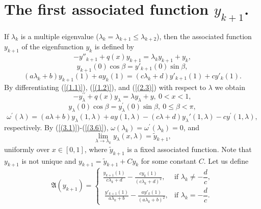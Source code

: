 \documentclass[10pt,a4paper]{amsart}
\numberwithin{equation}{section}
\begin{document}
\section{The first associated function \(y_{k + 1}\).}
If \(\lambda_{k}\) is a multiple  eigenvalue
(\(\lambda_{k} = \lambda_{k + 1}\le\lambda_{k + 2}\)), then the associated function
\(y_{k + 1}\) of the eigenfunction \(y_{k}\) is defined by
\begin{equation}
    {- y''_{k + 1}} + q(x)y_{k + 1} = \lambda_{k}y_{k + 1} + y_{k}, \label{(3.1)}
\end{equation}
\begin{equation}
y_{k + 1}(0)\cos\beta = y'_{k + 1}(0)\sin\beta, \label{(3.2)}
\end{equation}
\begin{equation}
\left( a\lambda_{k} + b \right)y_{k + 1}(1) + ay_{k}(1) = \left( c\lambda_{k} + d \right)y'_{k + 1}(1) + cy'_{k}(1). \label{(3.3)}
\end{equation}
By differentiating (\ref{(1.1)}), (\ref{(1.2)}), and (\ref{(2.3)}) with respect to $\lambda$ we obtain 
\begin{equation}
  -y_\lambda^{\prime \prime }+q(x)y_\lambda=\lambda y_\lambda+y,\ 0<x<1,  \label{(3.4)} 
\end{equation}
\begin{equation}
y_\lambda(0)\cos \beta =y_\lambda^{\prime }(0)\sin \beta ,\ 0\leq \beta <\pi ,
\label{(3.5)}
\end{equation}
\begin{equation}
 \omega^\prime(\lambda) = (a\lambda + b)y_\lambda(1,\lambda)+ay(1,\lambda) - (c\lambda + d)y_\lambda{'}(1,\lambda)-cy^\prime(1,\lambda), \label{(3.6)}   
\end{equation}
respectively. By (\ref{(3.1)})-(\ref{(3.6)}), \(\omega(\lambda_k)=\omega^\prime(\lambda_k)=0\), and $$\lim_{\lambda\to\lambda_k}y_\lambda(x,\lambda)=\tilde{y}_{k+1},$$uniformly over $x\in[0,1]$, where $\tilde{y}_{k+1}$ is a fixed associated function. Note that $y_{k + 1}$ is not unique and $y_{k + 1}=\tilde{y}_{k+1}+Cy_k$ for some constant $C$.
Let us define 
\begin{equation}
\mathfrak{A}(y_{k+1}) =
\begin{cases}
\displaystyle  
\frac{y_{k + 1}(1)}{c\lambda_{k}+d} - \frac{cy_{k}(1)}{{(c\lambda_{k}+d)}^{2}}, 
& \text{if } \lambda_k \neq -\dfrac{d}{c}, \\[10pt]
\displaystyle \ 
\frac{y'_{k + 1}(1)}{a\lambda_{k}+b} - \frac{ay'_{k}(1)}{{(a\lambda_{k}+b)}^{2}}, 
& \text{if } \lambda_k = -\dfrac{d}{c}.
\end{cases}\label{(3.7)}
\end{equation}
\end{document}
